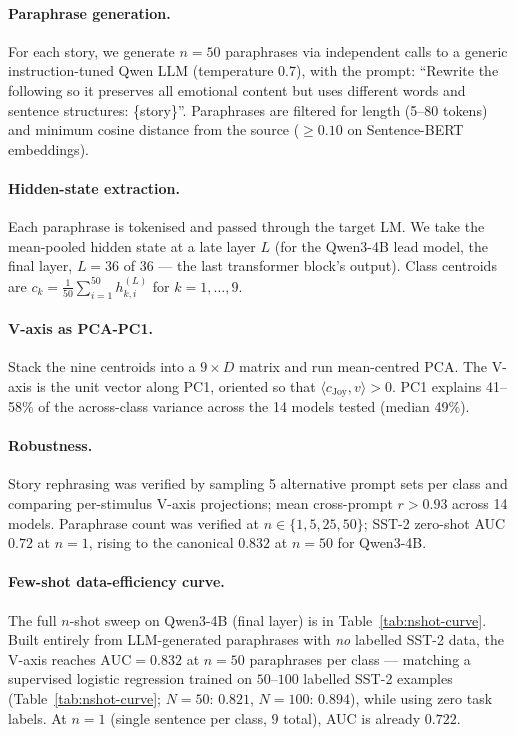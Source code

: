 \paragraph{Paraphrase generation.} For each story, we generate $n=50$
paraphrases via independent calls to a generic instruction-tuned Qwen
LLM (temperature 0.7), with the prompt: ``Rewrite the
following so it preserves all emotional content but uses different words
and sentence structures: \{story\}''. Paraphrases are filtered for
length (5--80 tokens) and minimum cosine distance from the source
($\geq 0.10$ on Sentence-BERT embeddings).

\paragraph{Hidden-state extraction.} Each paraphrase is tokenised and
passed through the target LM. We take the mean-pooled hidden state at a
late layer $L$ (for the Qwen3-4B lead model, the final layer,
$L=36$ of 36 --- the last transformer block's output). Class centroids
are $c_k = \frac{1}{50} \sum_{i=1}^{50} h_{k,i}^{(L)}$ for $k=1,\dots,9$.

\paragraph{V-axis as PCA-PC1.} Stack the nine centroids into a
$9 \times D$ matrix and run mean-centred PCA. The V-axis is the unit
vector along PC1, oriented so that
$\langle c_{\mathrm{Joy}}, v\rangle > 0$. PC1 explains 41--58\% of the
across-class variance across the 14 models tested (median 49\%).

\paragraph{Robustness.} Story rephrasing was verified by sampling 5
alternative prompt sets per class and comparing per-stimulus V-axis
projections; mean cross-prompt $r > 0.93$ across 14 models. Paraphrase
count was verified at $n \in \{1, 5, 25, 50\}$; SST-2 zero-shot AUC
$0.72$ at $n=1$, rising to the canonical $0.832$ at $n=50$ for
Qwen3-4B.

\paragraph{Few-shot data-efficiency curve.} The full $n$-shot sweep
on Qwen3-4B (final layer) is in Table~\ref{tab:nshot-curve}. Built
entirely from LLM-generated paraphrases with \emph{no} labelled SST-2
data, the V-axis reaches $\mathrm{AUC}=0.832$ at $n{=}50$ paraphrases
per class --- matching a supervised logistic regression trained on
$50$--$100$ labelled SST-2 examples (Table~\ref{tab:nshot-curve};
$N{=}50$: $0.821$, $N{=}100$: $0.894$), while using zero task labels.
At $n{=}1$ (single sentence per class, $9$ total), AUC is already
$0.722$.

